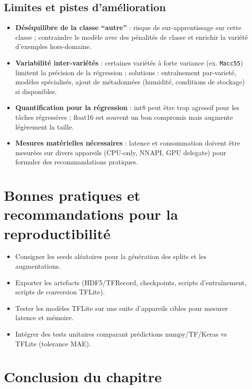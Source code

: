 \subsection{Limites et pistes d'amélioration}
\begin{itemize}
	\item \textbf{Déséquilibre de la classe ``autre''} : risque de sur-apprentissage sur cette classe ; contraindre le modèle avec des pénalités de classe et enrichir la variété d'exemples hors-domaine.
	\item \textbf{Variabilité inter-variétés} : certaines variétés à forte variance (ex. \texttt{Macc55}) limitent la précision de la régression ; solutions : entraînement par-varieté, modèles spécialisés, ajout de métadonnées (humidité, conditions de stockage) si disponibles.
	\item \textbf{Quantification pour la régression} : int8 peut être trop agressif pour les tâches régressives ; float16 est souvent un bon compromis mais augmente légèrement la taille.
	\item \textbf{Mesures matérielles nécessaires} : latence et consommation doivent être mesurées sur divers appareils (CPU-only, NNAPI, GPU delegate) pour formuler des recommandations pratiques.
\end{itemize}

\section{Bonnes pratiques et recommandations pour la reproductibilité}

\begin{itemize}
	\item Consigner les seeds aléatoires pour la génération des splits et les augmentations.
	\item Exporter les artefacts (HDF5/TFRecord, checkpoints, scripts d'entraînement, scripts de conversion TFLite).
	\item Tester les modèles TFLite sur une suite d'appareils cibles pour mesurer latence et mémoire.
	\item Intégrer des tests unitaires comparant prédictions numpy/TF/Keras vs TFLite (tolerance MAE).
\end{itemize}

\section{Conclusion du chapitre}


